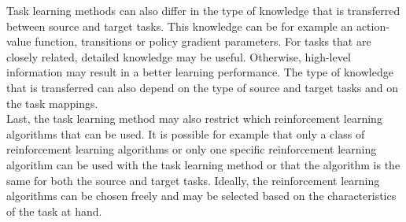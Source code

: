 \documentclass[a4paper, 11pt]{article}
\begin{document}
Task learning methods can also differ in the type of knowledge that is transferred between source and target tasks. This knowledge can be for example an action-value function, transitions or policy gradient parameters. For tasks that are closely related, detailed knowledge may be useful. Otherwise, high-level information may result in a better learning performance. The type of knowledge that is transferred can also depend on the type of source and target tasks and on the task mappings.\\

Last, the task learning method may also restrict which reinforcement learning algorithms that can be used. It is possible for example that only a class of reinforcement learning algorithms or only one specific reinforcement learning algorithm can be used with the task learning method or that the algorithm is the same for both the source and target tasks. Ideally, the reinforcement learning algorithms can be chosen freely and may be selected based on the characteristics of the task at hand.\\
\end{document}
